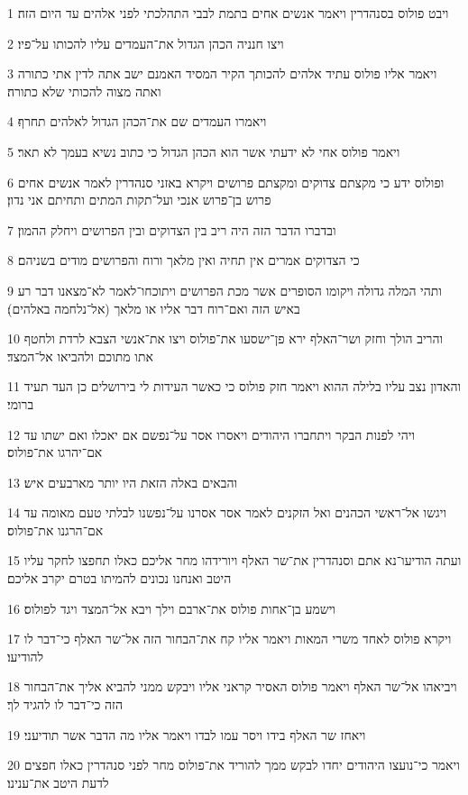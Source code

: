 \par 1 ויבט פולוס בסנהדרין ויאמר אנשים אחים בתמת לבבי התהלכתי לפני אלהים עד היום הזה׃
\par 2 ויצו חנניה הכהן הגדול את־העמדים עליו להכותו על־פיו׃
\par 3 ויאמר אליו פולוס עתיד אלהים להכותך הקיר המסיד האמנם ישב אתה לדין אתי כתורה ואתה מצוה להכותי שלא כתורה׃
\par 4 ויאמרו העמדים שם את־הכהן הגדול לאלהים תחרף׃
\par 5 ויאמר פולוס אחי לא ידעתי אשר הוא הכהן הגדול כי כתוב נשיא בעמך לא תאר׃
\par 6 ופולוס ידע כי מקצתם צדוקים ומקצתם פרושים ויקרא באזני סנהדרין לאמר אנשים אחים פרוש בן־פרוש אנכי ועל־תקות המתים ותחיתם אני נדון׃
\par 7 ובדברו הדבר הזה היה ריב בין הצדוקים ובין הפרושים ויחלק ההמון׃
\par 8 כי הצדוקים אמרים אין תחיה ואין מלאך ורוח והפרושים מודים בשניהם׃
\par 9 ותהי המלה גדולה ויקומו הסופרים אשר מכת הפרושים ויתוכחו־לאמר לא־מצאנו דבר רע באיש הזה ואם־רוח דבר אליו או מלאך (אל־נלחמה באלהים)׃
\par 10 והריב הולך וחזק ושר־האלף ירא פן־ישסעו את־פולוס ויצו את־אנשי הצבא לרדת ולחטף אתו מתוכם ולהביאו אל־המצד׃
\par 11 והאדון נצב עליו בלילה ההוא ויאמר חזק פולוס כי כאשר העידות לי בירושלים כן העד תעיד ברומי׃
\par 12 ויהי לפנות הבקר ויתחברו היהודים ויאסרו אסר על־נפשם אם יאכלו ואם ישתו עד אם־יהרגו את־פולוס׃
\par 13 והבאים באלה הזאת היו יותר מארבעים איש׃
\par 14 ויגשו אל־ראשי הכהנים ואל הזקנים לאמר אסר אסרנו על־נפשנו לבלתי טעם מאומה עד אם־הרגנו את־פולוס׃
\par 15 ועתה הודיעו־נא אתם וסנהדרין את־שר האלף ויורידהו מחר אליכם כאלו תחפצו לחקר עליו היטב ואנחנו נכונים להמיתו בטרם יקרב אליכם׃
\par 16 וישמע בן־אחות פולוס את־ארבם וילך ויבא אל־המצד ויגד לפולוס׃
\par 17 ויקרא פולוס לאחד משרי המאות ויאמר אליו קח את־הבחור הזה אל־שר האלף כי־דבר לו להודיעו׃
\par 18 ויביאהו אל־שר האלף ויאמר פולוס האסיר קראני אליו ויבקש ממני להביא אליך את־הבחור הזה כי־דבר לו להגיד לך׃
\par 19 ויאחז שר האלף בידו ויסר עמו לבדו ויאמר אליו מה הדבר אשר תודיעני׃
\par 20 ויאמר כי־נועצו היהודים יחדו לבקש ממך להוריד את־פולוס מחר לפני סנהדרין כאלו חפצים לדעת היטב את־ענינו׃
